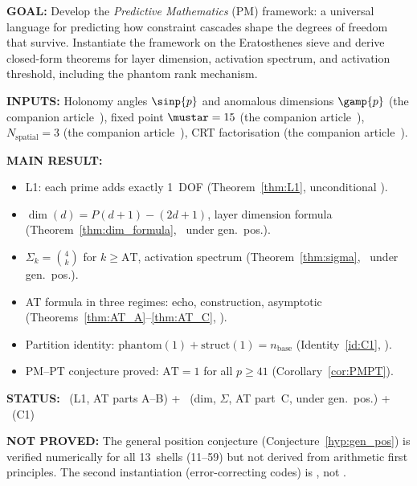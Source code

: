 \documentclass[12pt,a4paper]{article}
\begin{document}
\begin{statusbox}
\textbf{GOAL:}
  Develop the \emph{Predictive Mathematics} (PM) framework: a universal
  language for predicting how constraint cascades shape the degrees of
  freedom that survive.  Instantiate the framework on the Eratosthenes
  sieve and derive closed-form theorems for layer dimension, activation
  spectrum, and activation threshold, including the phantom rank mechanism.

\textbf{INPUTS:}
  Holonomy angles $\sinp{p}$ and anomalous dimensions $\gamp{p}$
  (the companion article~\cite{companion_M2}),
  fixed point $\mustar = 15$ (the companion article~\cite{companion_M3}),
  $N_{\mathrm{spatial}} = 3$ (the companion article~\cite{companion_M3}),
  CRT factorisation (the companion article~\cite{companion_M1}).

\textbf{MAIN RESULT:}
  \begin{itemize}[nosep]
  \item L1: each prime adds exactly 1~DOF
    (Theorem~\ref{thm:L1}, unconditional \THMTAG).
  \item $\dim(d) = P(d{+}1) - (2d{+}1)$, layer dimension formula
    (Theorem~\ref{thm:dim_formula}, \THMTAG\ under gen.\ pos.).
  \item $\Sigma_k = \binom{4}{k}$ for $k \ge \mathrm{AT}$, activation spectrum
    (Theorem~\ref{thm:sigma}, \THMTAG\ under gen.\ pos.).
  \item AT formula in three regimes: echo, construction, asymptotic
    (Theorems~\ref{thm:AT_A}--\ref{thm:AT_C}, \THMTAG).
  \item Partition identity: $\mathrm{phantom}(1) + \mathrm{struct}(1) = n_{\mathrm{base}}$
    (Identity~\ref{id:C1}, \IDTAG).
  \item PM--PT conjecture proved: $\mathrm{AT} = 1$ for all $p \ge 41$
    (Corollary~\ref{cor:PMPT}).
  \end{itemize}

\textbf{STATUS:}
  \THMTAG~(L1, AT parts A--B) + \THMTAG~(dim, $\Sigma$, AT part~C, under gen.\ pos.) + \IDTAG~(C1)

\textbf{NOT PROVED:}
  The general position conjecture (Conjecture~\ref{hyp:gen_pos}) is verified
  numerically for all 13~shells (11--59) but not derived from arithmetic
  first principles.  The second instantiation (error-correcting codes) is
  \VALTAG, not \THMTAG.
\end{statusbox}

\end{document}
